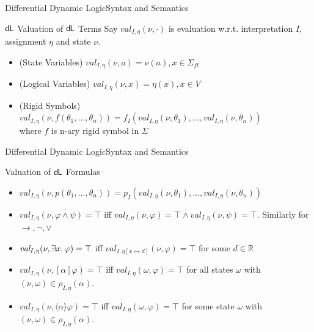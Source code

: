 \documentclass{beamer}
\newcommand{\dL}{\text{\upshape\textsf{d{\kern-0.05em}L}}}
\newcommand{\R}{\mathbb{R}}
\newcommand{\val}[4]{\textit{val}_{#1, #2}(#3, #4)}
\newcommand{\valDefault}[1]{\val{I}{\eta}{\nu}{#1}}
\newcommand{\transRel}[3]{\rho_{#1, #2}(#3)}
\newcommand{\transRelDef}[1]{\transRel{I}{\eta}{#1}}
\begin{document}
\begin{frame}{Differential Dynamic Logic}{Syntax and Semantics}
    \begin{block}{$\dL$ Valuation of $\dL$ Terms}
      Say $\valDefault{\cdot}$ is evaluation w.r.t. interpretation $I$, assignment $\eta$ and state $\nu$.
      \pause
      \begin{itemize}
      \item (State Variables) $\valDefault{a} = \nu(a), x \in \Sigma_{\textit{fl}}$
        \pause
      \item (Logical Variables) $\valDefault{x} = \eta(x), x \in V$
        \pause
      \item (Rigid Symbols) $\valDefault{f(\theta_1, \ldots, \theta_n)} =
          f_I(\valDefault{\theta_1}, \ldots, \valDefault{\theta_n})$ \\
          where $f$ is n-ary rigid symbol in $\Sigma$
      \end{itemize}
    \end{block}
\end{frame}

\begin{frame}{Differential Dynamic Logic}{Syntax and Semantics}
    \begin{block}{Valuation of $\dL$ Formulas}
      \begin{itemize}
      \item $\valDefault{p(\theta_1, \ldots, \theta_n)} = p_I(\valDefault{\theta_1}, \ldots, \valDefault{\theta_n})$
      \item $\valDefault{\varphi \wedge \psi} = \top$ iff
        $\valDefault{\varphi} = \top \wedge \valDefault{\psi} = \top$.
        Similarly for $\to, \neg, \vee$
      \item $\valDefault{\exists x \ldotp \varphi} = \top$ iff
        $\val{I}{\eta[x \mapsto d]}{\nu}{\varphi} = \top$ for some $d \in \R$
      \pause
      \item $\valDefault{[\alpha]\varphi} = \top$ iff
        $\val{I}{\eta}{\omega}{\varphi} = \top$ for all states $\omega$ with $(\nu, \omega)
        \in \transRelDef{\alpha}$.
      \item $\valDefault{\langle\alpha\rangle\varphi} = \top$ iff
        $\val{I}{\eta}{\omega}{\varphi} = \top$ for some state $\omega$ with $(\nu, \omega)
        \in \transRelDef{\alpha}$.
      \end{itemize}
    \end{block}
\end{frame}
\end{document}
